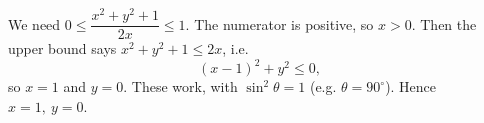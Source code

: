 We need $0\le\dfrac{x^2+y^2+1}{2x}\le1$. The numerator is positive, so $x>0$. Then the upper bound says $x^2+y^2+1\le2x$, i.e.
\[(x-1)^2+y^2\le0,\]
so $x=1$ and $y=0$. These work, with $\sin^2\theta=1$ (e.g. $\theta=90^\circ$). Hence $\boxed{x=1,\ y=0}$.
